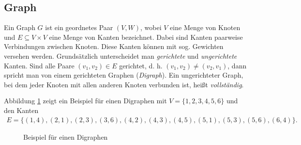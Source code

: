 \subsection{Graph}
\begin{defi}
  Ein Graph $G$ ist ein geordnetes Paar $(V,W)$, wobei $V$ eine Menge
  von Knoten und $E \subseteq V \times V$ eine Menge von Kanten
  bezeichnet. Dabei sind Kanten paarweise Verbindungen zwischen
  Knoten. Diese Kanten können mit sog. Gewichten versehen
  werden. Grundsätzlich unterscheidet man \emph{gerichtete} und
  \emph{ungerichtete} Kanten. Sind alle Paare $(v_1, v_2) \in E$
  gerichtet, d. h. $(v_1, v_2) \neq (v_2, v_1)$, dann spricht man von
  einem gerichteten Graphen (\emph{Digraph}). Ein ungerichteter Graph,
  bei dem jeder Knoten mit allen anderen Knoten verbunden ist, heißt
  \emph{vollständig}.
\end{defi}

\begin{bsp}
  Abbildung \ref{digraph} zeigt ein Beispiel für einen Digraphen mit
  $V=\{1,2,3,4,5,6\}$ und den Kanten
  \begin{gather*}
    E=\{(1,4), (2,1), (2,3), (3,6), (4,2), (4,3), (4,5), (5,1), (5,3),
    (5,6), (6,4)\}.
  \end{gather*}
  \label{bsp:digraph}
\end{bsp}

\begin{figure}[!h]
  \centering
              \caption{Beispiel für einen Digraphen}
              \label{digraph}
            \end{figure}

